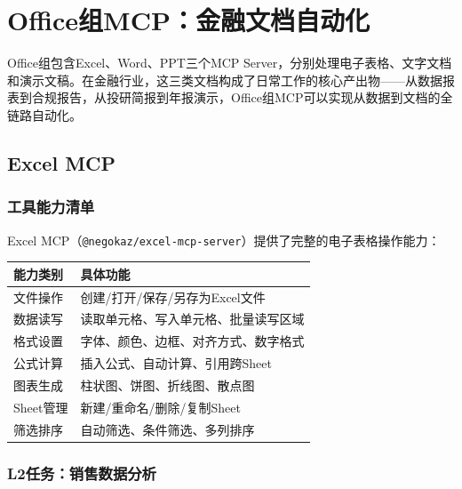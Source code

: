 \section{Office组MCP：金融文档自动化}

Office组包含Excel、Word、PPT三个MCP Server，分别处理电子表格、文字文档和演示文稿。在金融行业，这三类文档构成了日常工作的核心产出物——从数据报表到合规报告，从投研简报到年报演示，Office组MCP可以实现从数据到文档的全链路自动化。

\subsection{Excel MCP}

\subsubsection{工具能力清单}

Excel MCP（\texttt{@negokaz/excel-mcp-server}）提供了完整的电子表格操作能力：

\begin{table}[H]
\centering
\begin{tabular}{lp{9cm}}
\toprule
\textbf{能力类别} & \textbf{具体功能} \\
\midrule
文件操作 & 创建/打开/保存/另存为Excel文件 \\
数据读写 & 读取单元格、写入单元格、批量读写区域 \\
格式设置 & 字体、颜色、边框、对齐方式、数字格式 \\
公式计算 & 插入公式、自动计算、引用跨Sheet \\
图表生成 & 柱状图、饼图、折线图、散点图 \\
Sheet管理 & 新建/重命名/删除/复制Sheet \\
筛选排序 & 自动筛选、条件筛选、多列排序 \\
\bottomrule
\end{tabular}
\end{table}

\subsubsection{L2任务：销售数据分析}

